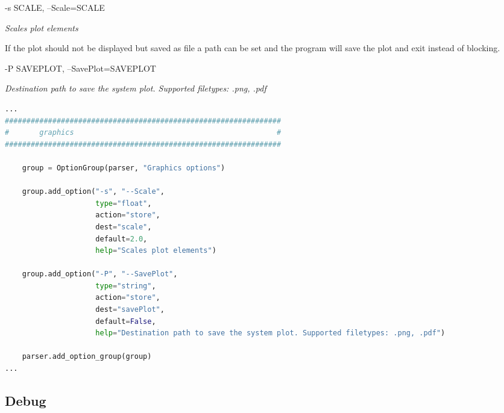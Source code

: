 \vspace{2em}
\begin{addmargin}[2em]{1em}
-s SCALE, --Scale=SCALE

\textit{Scales plot elements}
\end{addmargin}
\vspace{2em}

If the plot should not be displayed but saved as file a path can be set and the program will save the plot and exit instead of blocking.

\vspace{2em}
\begin{addmargin}[2em]{1em}
-P SAVEPLOT, --SavePlot=SAVEPLOT

\textit{Destination path to save the system plot. Supported filetypes: .png, .pdf}
\end{addmargin}
\vspace{2em}

\begin{inconsolata}
\begin{minipage}{\linewidth}
\begin{lstlisting}[language=python]
...
################################################################
#       graphics                                               #
################################################################

    group = OptionGroup(parser, "Graphics options")

    group.add_option("-s", "--Scale",
                     type="float",
                     action="store",
                     dest="scale",
                     default=2.0,
                     help="Scales plot elements")

    group.add_option("-P", "--SavePlot",
                     type="string",
                     action="store",
                     dest="savePlot",
                     default=False,
                     help="Destination path to save the system plot. Supported filetypes: .png, .pdf")

    parser.add_option_group(group)
...
\end{lstlisting}
\end{minipage}
\end{inconsolata}

\subsection{Debug}
\label{subsec:debug}

